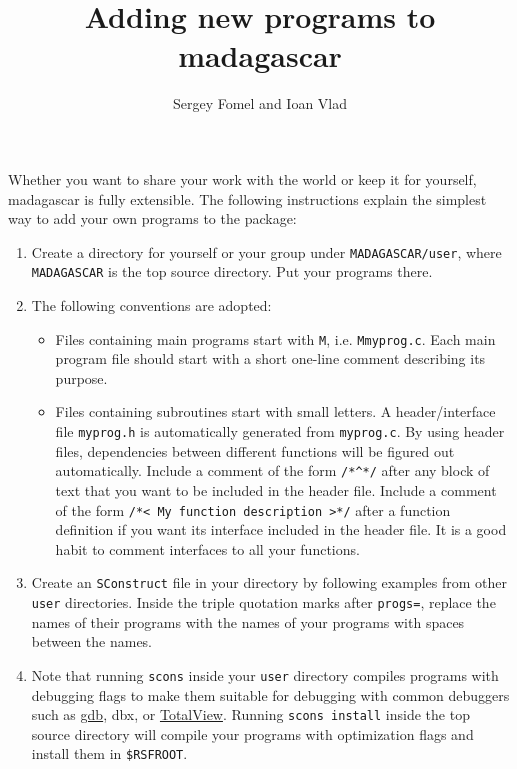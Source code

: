 \title{Adding new programs to madagascar}
\author{Sergey Fomel and Ioan Vlad}
\shortpaper
\maketitle

Whether you want to share your work with the world or keep it for
yourself, madagascar is fully extensible. The following instructions
explain the simplest way to add your own programs to the package:

\begin{enumerate}
\item Create a directory for yourself or your group under
\texttt{MADAGASCAR/user}, where \texttt{MADAGASCAR} is the top source
directory. Put your programs there. 
\item The following conventions are adopted:
\begin{itemize}
\item Files containing main programs start with \texttt{M},
i.e. \texttt{Mmyprog.c}. Each main program file should start with a
short one-line comment describing its purpose.
\item Files containing subroutines start with small letters. A
header/interface file \texttt{myprog.h} is automatically generated
from \texttt{myprog.c}. By using header files, dependencies between
different functions will be figured out automatically. Include a
comment of the form \verb#/*^*/# after any block of text that you
want to be included in the header file. Include a comment of the form
\verb#/*< My function description >*/# after a function definition
if you want its interface included in the header file.  It is a good
habit to comment interfaces to all your functions.
\end{itemize}
\item Create an \texttt{SConstruct} file in your directory by following examples from other \texttt{user} directories. 
Inside the triple quotation marks after \texttt{progs=}, replace the
names of their programs with the names of your programs with spaces
between the names.
\item Note that running \texttt{scons} inside your \texttt{user}
directory compiles programs with debugging flags to make them
suitable for debugging with common debuggers such as
\href{http://www.gnu.org/software/gdb/}{gdb}, dbx, or
\href{http://www.etnus.com/}{TotalView}. Running 
\texttt{scons install} inside the top source directory will compile your programs with optimization flags and install them in \texttt{\$RSFROOT}.

\end{enumerate}
